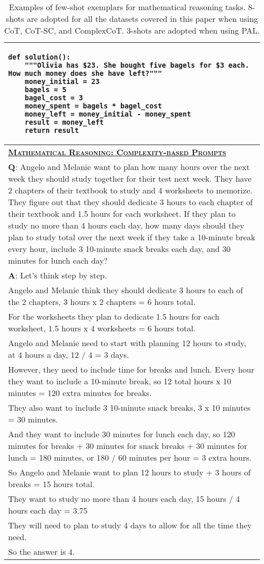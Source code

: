 \begin{table}[htbp]
\begin{tabular}{p{}}
\begin{verbatim}
def solution():
    """Olivia has $23. She bought five bagels for $3 each. How much money does she have left?"""
    money_initial = 23
    bagels = 5
    bagel_cost = 3
    money_spent = bagels * bagel_cost
    money_left = money_initial - money_spent
    result = money_left
    return result
\end{verbatim}
        \\
        \midrule
\underline{\textbf{\textsc{Mathematical Reasoning: Complexity-based Prompts}}} \\
\textbf{Q}: Angelo and Melanie want to plan how many hours over the next week they should study together for their test next week. They have 2 chapters of their textbook to study and 4 worksheets to memorize. They figure out that they should dedicate 3 hours to each chapter of their textbook and 1.5 hours for each worksheet. If they plan to study no more than 4 hours each day, how many days should they plan to study total over the next week if they take a 10-minute break every hour, include 3 10-minute snack breaks each day, and 30 minutes for lunch each day? \\
\textbf{A}: Let's think step by step. \\
Angelo and Melanie think they should dedicate 3 hours to each of the 2 chapters, 3 hours x 2 chapters = 6 hours total. \\
For the worksheets they plan to dedicate 1.5 hours for each worksheet, 1.5 hours x 4 worksheets = 6 hours total. \\
Angelo and Melanie need to start with planning 12 hours to study, at 4 hours a day, 12 / 4 = 3 days. \\
However, they need to include time for breaks and lunch. Every hour they want to include a 10-minute break, so 12 total hours x 10 minutes = 120 extra minutes for breaks. \\
They also want to include 3 10-minute snack breaks, 3 x 10 minutes = 30 minutes. \\
And they want to include 30 minutes for lunch each day, so 120 minutes for breaks + 30 minutes for snack breaks + 30 minutes for lunch = 180 minutes, or 180 / 60 minutes per hour = 3 extra hours. \\
So Angelo and Melanie want to plan 12 hours to study + 3 hours of breaks = 15 hours total. \\
They want to study no more than 4 hours each day, 15 hours / 4 hours each day = 3.75 \\
They will need to plan to study 4 days to allow for all the time they need. \\
So the answer is 4. \\
        \bottomrule
    \end{tabular}
     \caption{Examples of few-shot exemplars for mathematical reasoning tasks. 8-shots are adopted for all the datasets covered in this paper when using CoT, CoT-SC, and ComplexCoT. 3-shots are adopted when using PAL.}
    \label{tab:exp-math}
\end{table}


